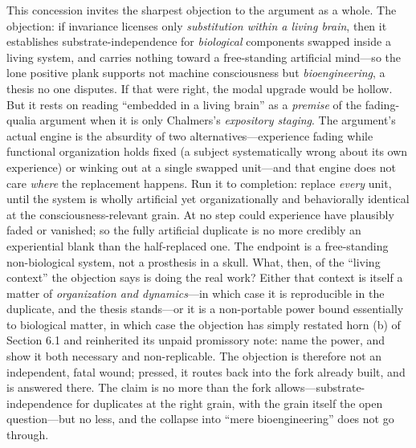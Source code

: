 \documentclass[11pt]{article}
\begin{document}
This concession invites the sharpest objection to the argument as a whole. The objection: if invariance licenses only \emph{substitution within a living brain}, then it establishes substrate-independence for \emph{biological} components swapped inside a living system, and carries nothing toward a free-standing artificial mind---so the lone positive plank supports not machine consciousness but \emph{bioengineering}, a thesis no one disputes. If that were right, the modal upgrade would be hollow. But it rests on reading ``embedded in a living brain'' as a \emph{premise} of the fading-qualia argument when it is only Chalmers's \emph{expository staging}. The argument's actual engine is the absurdity of two alternatives---experience fading while functional organization holds fixed (a subject systematically wrong about its own experience) or winking out at a single swapped unit---and that engine does not care \emph{where} the replacement happens. Run it to completion: replace \emph{every} unit, until the system is wholly artificial yet organizationally and behaviorally identical at the consciousness-relevant grain. At no step could experience have plausibly faded or vanished; so the fully artificial duplicate is no more credibly an experiential blank than the half-replaced one. The endpoint is a free-standing non-biological system, not a prosthesis in a skull. What, then, of the ``living context'' the objection says is doing the real work? Either that context is itself a matter of \emph{organization and dynamics}---in which case it is reproducible in the duplicate, and the thesis stands---or it is a non-portable power bound essentially to biological matter, in which case the objection has simply restated horn (b) of Section 6.1 and reinherited its unpaid promissory note: name the power, and show it both necessary and non-replicable. The objection is therefore not an independent, fatal wound; pressed, it routes back into the fork already built, and is answered there. The claim is no more than the fork allows---substrate-independence for duplicates at the right grain, with the grain itself the open question---but no less, and the collapse into ``mere bioengineering'' does not go through.
\end{document}
